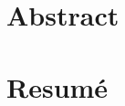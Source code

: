 \section*{Abstract}

\begin{center}
\end{center}
\begin{RLtext}



\end{RLtext}



\section*{Resumé}


